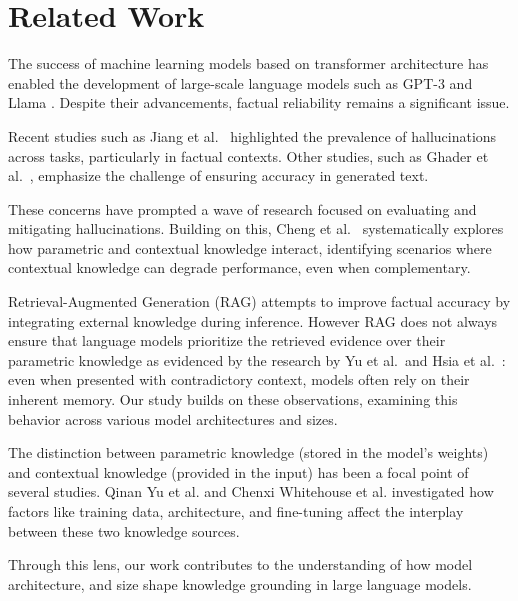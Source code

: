 \section{Related Work}

The success of machine learning models based on transformer architecture \cite{attention_is_all_you_need} has enabled the development of large-scale language models such as GPT-3 \cite{gpt3} and Llama \cite{llama}.
Despite their advancements, factual reliability remains a significant issue.

Recent studies such as Jiang et al.\ \cite{how_can_we_know} highlighted the prevalence of hallucinations across tasks, particularly in factual contexts.
Other studies, such as Ghader et al.\ \cite{can_rag_models_reason}, emphasize the challenge of ensuring accuracy in generated text.

These concerns have prompted a wave of research focused on evaluating and mitigating hallucinations.
Building on this, Cheng et al.\ \cite{understanding_the_interplay} systematically explores how parametric and contextual knowledge interact, identifying scenarios where contextual knowledge can degrade performance, even when complementary.

Retrieval-Augmented Generation (RAG) \cite{rag} attempts to improve factual accuracy by integrating external knowledge during inference.
However RAG does not always ensure that language models prioritize the retrieved evidence over their parametric knowledge as evidenced by the research by Yu et al.\ and Hsia et al.\ \cite{ragged,factual_recall}: even when presented with contradictory context, models often rely on their inherent memory.
Our study builds on these observations, examining this behavior across various model architectures and sizes.

The distinction between parametric knowledge (stored in the model's weights) and contextual knowledge (provided in the input) has been a focal point of several studies.
Qinan Yu et al. \cite{factual_recall} and Chenxi Whitehouse et al. \cite{knowledge_grounding_retrieval_augmented} investigated how factors like training data, architecture, and fine-tuning affect the interplay between these two knowledge sources.

Through this lens, our work contributes to the understanding of how model architecture, and size shape knowledge grounding in large language models.
